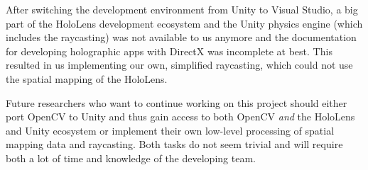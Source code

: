 After switching the development environment from Unity to Visual Studio, a big part of the HoloLens development ecosystem and the Unity physics engine (which includes the raycasting) was not available to us anymore and the documentation for developing holographic apps with DirectX was incomplete at best.
This resulted in us implementing our own, simplified raycasting, which could not use the spatial mapping of the HoloLens.

Future researchers who want to continue working on this project should either port OpenCV to Unity and thus gain access to both OpenCV \emph{and} the HoloLens and Unity ecosystem or implement their own low-level processing of spatial mapping data and raycasting. Both tasks do not seem trivial and will require both a lot of time and knowledge of the developing team.

